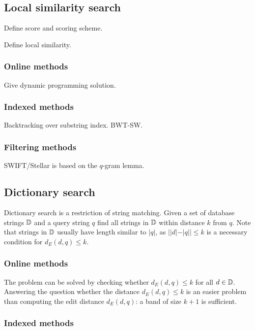 \subsection{Local similarity search}

Define score and scoring scheme.

Define local similarity.

\subsubsection{Online methods}
Give dynamic programming solution.

\subsubsection{Indexed methods}
Backtracking over substring index. BWT-SW.

\subsubsection{Filtering methods}
SWIFT/Stellar is based on the $q$-gram lemma.



\subsection{Dictionary search}

Dictionary search is a restriction of string matching.
Given a set of database strings $\mathbb {D}$ and a query string $q$ find all strings in $\mathbb {D}$ within distance $k$ from $q$.
Note that strings in $\mathbb {D}$ usually have length similar to $|q|$, as $| |d| - |q| | \leq k$ is a necessary condition for $d_E(d,q) \leq k$.

\subsubsection{Online methods}

The problem can be solved by checking whether $d_E(d,q) \leq k$ for all $d \in \mathbb {D}$.
Answering the question whether the distance $d_E(d,q) \leq k$ is an easier problem than computing the edit distance $d_E(d,q)$: a band of size $k+1$ is sufficient.

\subsubsection{Indexed methods}

